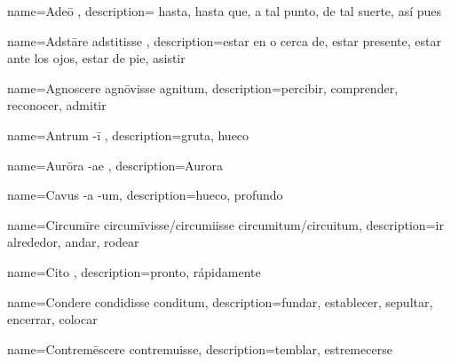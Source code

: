 






{name={Adeō },
description={ hasta, hasta que, a tal punto, de tal suerte, así pues}}

{name={Adstāre adstitisse },
description={estar en o cerca de, estar presente, estar ante los ojos, estar de pie, asistir}}

{name={Agnoscere agnōvisse agnitum},
description={percibir, comprender, reconocer, admitir}}

{name={Antrum -ī },
description={gruta, hueco}}

{name={Aurōra -ae },
description={Aurora}}

{name={Cavus -a -um},
description={hueco, profundo}}

{name={Circumīre circumīvisse/circumiisse circumitum/circuitum},
description={ir alrededor, andar, rodear}}


{name={Cito },
description={pronto, rápidamente}}

{name={Condere condidisse conditum},
description={fundar, establecer, sepultar, encerrar, colocar}}

{name={Contremēscere contremuisse},
description={temblar, estremecerse}}

